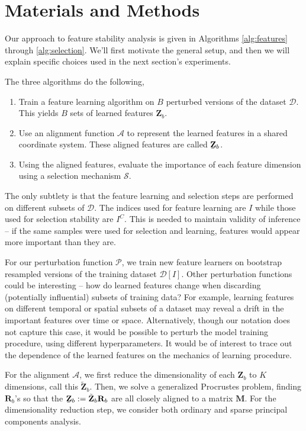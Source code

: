 
\section{Materials and Methods}

Our approach to feature stability analysis is given in Algorithms
\ref{alg:features} through \ref{alg:selection}. We'll first motivate the general
setup, and then we will explain specific choices used in the next section's
experiments.

The three algorithms do the following,
\begin{enumerate}
  \item Train a feature learning algorithm on $B$ perturbed versions of the
    dataset $\mathcal{D}$. This yields $B$ sets of learned features
    $\mathbf{Z}_{b}$.
  \item Use an alignment function $\mathcal{A}$ to represent the learned
    features in a shared coordinate system. These aligned features are called
    $\underaccent{\bar}{\mathbf{Z}}_{b}$.
  \item Using the aligned features, evaluate the importance of each feature
    dimension using a selection mechanism $\mathcal{S}$.
\end{enumerate}

The only subtlety is that the feature learning and selection steps are performed
on different subsets of $\mathcal{D}$. The indices used for feature learning are
$I$ while those used for selection stability are $I^{C}$. This is needed to
maintain validity of inference -- if the same samples were used for selection
and learning, features would appear more important than they are.

For our perturbation function $\mathcal{P}$, we train new feature learners on
bootstrap resampled versions of the training dataset
$\mathcal{D}\left[I\right]$. Other perturbation functions could be interesting
-- how do learned features change when discarding (potentially influential)
subsets of training data? For example, learning features on different temporal
or spatial subsets of a dataset may reveal a drift in the important features
over time or space. Alternatively, though our notation does not capture this
case, it would be possible to perturb the model training procedure, using
different hyperparameters. It would be of interest to trace out the dependence
of the learned features on the mechanics of learning procedure.

For the alignment $\mathcal{A}$, we first reduce the dimensionality of each
$\mathbf{Z}_{b}$ to $K$ dimensions, call this $\tilde{\mathbf{Z}}_{b}$. Then, we
solve a generalized Procrustes problem, finding $\mathbf{R}_{b}$'s so that the
$\underaccent{\bar}{\mathbf{Z}}_{b} := \tilde{\mathbf{Z}}_{b}\mathbf{R}_{b}$ are
all closely aligned to a matrix $\mathbf{M}$. For the dimensionality reduction
step, we consider both ordinary and sparse principal components analysis.

